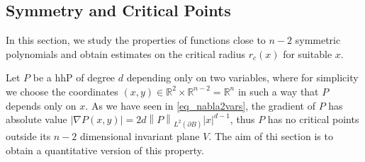 \documentclass[11pt]{article}
\begin{document}
\subsection{Symmetry and Critical Points}\label{ss:symmetric_criticalpoints}
In this section, we study the properties of functions close to $n-2$ symmetric polynomials and obtain estimates on the critical radius $r_c(x)$ for suitable $x$.

Let $P$ be a hhP of degree $d$ depending only on two variables, where for simplicity we choose the coordinates $(x,y)\in {\mathbb{R}}^2\times {\mathbb{R}}^{n-2} ={\mathbb{R}}^n$ in such a way that $P$ depends only on $x$. As we have seen in \eqref{eq_nabla2vars}, the gradient of $P$ has absolute value ${\left|{\nabla P (x,y)}\right|}= 2d {\left\|{P}\right\|}_{L^2(\partial B)} {\left|x\right|} ^{d-1}$, thus $P$ has no critical points outside its $n-2$ dimensional invariant plane $V$. The aim of thi section is to obtain a quantitative version of this property.
\end{document}
